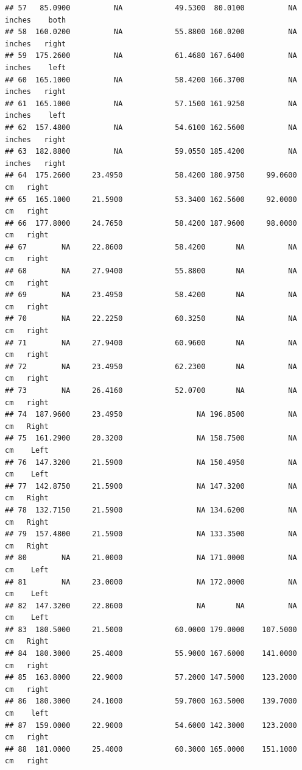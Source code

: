 \documentclass[]{article}
\begin{document}
\begin{verbatim}
## 57   85.0900          NA            49.5300  80.0100          NA inches    both
## 58  160.0200          NA            55.8800 160.0200          NA inches   right
## 59  175.2600          NA            61.4680 167.6400          NA inches    left
## 60  165.1000          NA            58.4200 166.3700          NA inches   right
## 61  165.1000          NA            57.1500 161.9250          NA inches    left
## 62  157.4800          NA            54.6100 162.5600          NA inches   right
## 63  182.8800          NA            59.0550 185.4200          NA inches   right
## 64  175.2600     23.4950            58.4200 180.9750     99.0600     cm   right
## 65  165.1000     21.5900            53.3400 162.5600     92.0000     cm   right
## 66  177.8000     24.7650            58.4200 187.9600     98.0000     cm   right
## 67        NA     22.8600            58.4200       NA          NA     cm   right
## 68        NA     27.9400            55.8800       NA          NA     cm   right
## 69        NA     23.4950            58.4200       NA          NA     cm   right
## 70        NA     22.2250            60.3250       NA          NA     cm   right
## 71        NA     27.9400            60.9600       NA          NA     cm   right
## 72        NA     23.4950            62.2300       NA          NA     cm   right
## 73        NA     26.4160            52.0700       NA          NA     cm   right
## 74  187.9600     23.4950                 NA 196.8500          NA     cm   Right
## 75  161.2900     20.3200                 NA 158.7500          NA     cm    Left
## 76  147.3200     21.5900                 NA 150.4950          NA     cm    Left
## 77  142.8750     21.5900                 NA 147.3200          NA     cm   Right
## 78  132.7150     21.5900                 NA 134.6200          NA     cm   Right
## 79  157.4800     21.5900                 NA 133.3500          NA     cm   Right
## 80        NA     21.0000                 NA 171.0000          NA     cm    Left
## 81        NA     23.0000                 NA 172.0000          NA     cm    Left
## 82  147.3200     22.8600                 NA       NA          NA     cm    Left
## 83  180.5000     21.5000            60.0000 179.0000    107.5000     cm   Right
## 84  180.3000     25.4000            55.9000 167.6000    141.0000     cm   right
## 85  163.8000     22.9000            57.2000 147.5000    123.2000     cm   right
## 86  180.3000     24.1000            59.7000 163.5000    139.7000     cm    left
## 87  159.0000     22.9000            54.6000 142.3000    123.2000     cm   right
## 88  181.0000     25.4000            60.3000 165.0000    151.1000     cm   right

\end{verbatim}
\end{document}
